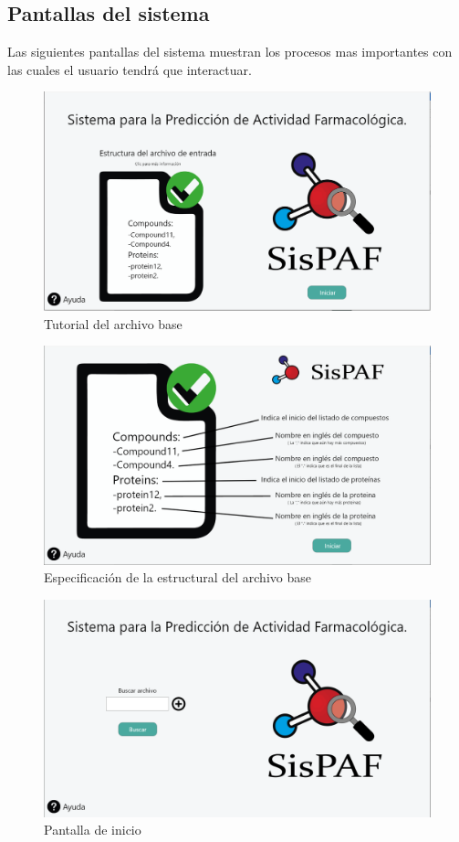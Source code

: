 \subsection{Pantallas del sistema}
\noindent Las siguientes pantallas del sistema muestran los procesos mas importantes con las cuales el usuario tendrá que interactuar.
\begin{figure}[H]
    \centering
    \includegraphics[scale=0.4]{Capitulo2/images/UI/1_tutorial.PNG}
    \caption{Tutorial del archivo base}
    \label{Tutorial_1}
\end{figure}
\begin{figure}[H]
    \centering
    \includegraphics[scale=0.4]{Capitulo2/images/UI/2_tutorial.PNG}
    \caption{Especificación de la estructural del archivo base }
    \label{Tutorial_2}
\end{figure}
\begin{figure}[H]
    \centering
    \includegraphics[scale=0.4]{Capitulo2/images/UI/3_pantalla_inicio.PNG}
    \caption{Pantalla de inicio}
    \label{Pantalla_de_inicio}
\end{figure}
